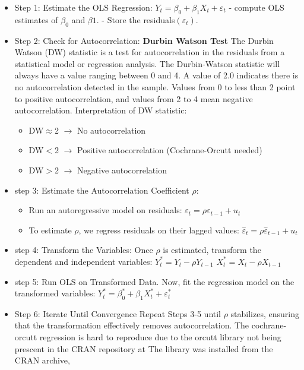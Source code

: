 \documentclass[11pt]{article}
\begin{document}
\begin{itemize}
    \item Step 1: Estimate the OLS Regression:\newline
    $Y_t=\beta_0+\beta_1X_t+\varepsilon_t$\newline
    - compute OLS estimates of $\beta_0$ and $\beta1$. \newline
    - Store the residuals$(\varepsilon_t)$.
    \item Step 2: Check for Autocorrelation:
    \textbf{Durbin Watson Test}\newline
    The Durbin Watson (DW) statistic is a test for autocorrelation in the residuals from a statistical model or regression analysis. The Durbin-Watson statistic will always have a value ranging between 0 and 4. A value of 2.0 indicates there is no autocorrelation detected in the sample. Values from 0 to less than 2 point to positive autocorrelation, and values from 2 to 4 mean negative autocorrelation.
    Interpretation of DW statistic:
    \begin{itemize}
        \item DW$\approx$2 $\rightarrow$ No autocorrelation 
        \item DW$ < $2 $\rightarrow$ Positive autocorrelation  (Cochrane-Orcutt needed)
        \item DW$>$2 $\rightarrow$ Negative autocorrelation
    \end{itemize}
    \item step 3: Estimate the Autocorrelation Coefficient $\rho$:
    \begin{itemize}
        \item Run an autoregressive model on residuals:\newline
        $\varepsilon_t = \rho \varepsilon_{t-1} + u_t$\
        \item To estimate $\rho$, we regress residuals on their lagged values:\newline
    $\hat{\varepsilon}_t = \rho \hat{\varepsilon}_{t-1} + u_t$
    \end{itemize}
    \item step 4: Transform the Variables:\newline
    Once $\rho$ is estimated, transform the dependent and independent variables:\newline
    $Y_t^* = Y_t - \rho Y_{t-1}$\newline
    $X_t^* = X_t - \rho X_{t-1}$
    \item step 5: Run OLS on Transformed Data. Now, fit the regression model on the transformed variables:\newline
    $Y_t^* = \beta_0^* + \beta_1 X_t^* + \varepsilon_t^*$

    \item Step 6: Iterate Until Convergence
    Repeat Steps 3-5 until $\rho$ stabilizes, ensuring that the transformation effectively removes autocorrelation.
    The cochrane-orcutt regression is hard to reproduce due to the orcutt library not being prescent in the CRAN repository at \cite{orcutt2023}
The library was installed from the CRAN archive,
\end{itemize}
\end{document}
